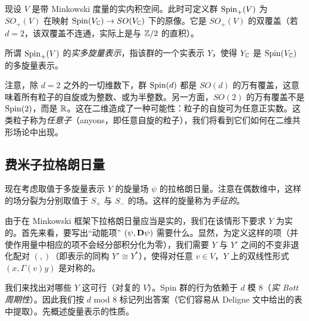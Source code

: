 现设 $V$ 是带 Minkowski 度量的实内积空间。此时可定义群 ${\rm Spin}_+(V)$ 为 $SO_+(V)$ 在映射 ${\rm Spin}(V_{\Bbb C})\to SO(V_{\Bbb C})$ 下的原像。它是 $SO_+(V)$ 的双覆盖（若 $d=2$，该双覆盖不连通，实际上是与 $\Bbb Z/2$ 的直积）。

所谓 ${\rm Spin}_+(V)$ 的\emph{实多旋量表示}，指该群的一个实表示 $Y$，使得 $Y_{\Bbb C}$ 是 ${\rm Spin}(V_{\Bbb C})$ 的多旋量表示。


\begin{remark}\label{anyons} 注意，除 $d=2$ 之外的一切维数下，群 ${\rm Spin}(d)$ 都是 $SO(d)$ 的万有覆盖，这意味着所有粒子的自旋或为整数、或为半整数。另一方面，$SO(2)$ 的万有覆盖不是 ${\rm Spin}(2)$，而是 $\Bbb R$。这在二维造成了一种可能性：粒子的自旋可为任意正实数。这类粒子称为\emph{任意子}（anyons，即任意自旋的粒子），我们将看到它们如何在二维共形场论中出现。
\end{remark}

\subsection{费米子拉格朗日量}\label{ferlag}

现在考虑取值于多旋量表示 $Y$ 的旋量场 $\psi$ 的拉格朗日量。注意在偶数维中，这样的场分裂为分别取值于 $S_+$ 与 $S_-$ 的场。这样的旋量称为\emph{手征的}。

由于在 Minkowski 框架下拉格朗日量应当是实的，我们在该情形下要求 $Y$ 为实的。首先来看，要写出“动能项” $(\psi,\bold D\psi)$ 需要什么。显然，为定义这样的项（并使作用量中相应的项不会经分部积分化为零），我们需要 $Y$ 与 $Y'$ 之间的不变非退化配对 $(,)$（即表示的同构 $Y'\cong Y^*$），使得对任意 $v\in V$，$Y$ 上的双线性形式 $(x,\Gamma(v)y)$ 是对称的。

我们来找出对哪些 $Y$ 这可行（对复的 $V$）。Spin 群的行为依赖于 $d$ 模 $8$（\emph{实 Bott 周期性}）。因此我们按 $d$ mod $8$ 标记列出答案（它们容易从 Deligne 文中给出的表中提取）。先概述旋量表示的性质。

